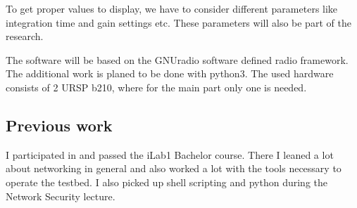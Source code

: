 \documentclass[NET,a4,12pt,ngerman]{netforms}
\begin{document}
To get proper values to display, we have to consider different parameters like
integration time and gain settings etc.
These parameters will also be part of the research.

The software will be based on the GNUradio \cite{gnuradio} software defined radio
framework.  The additional work is planed to be done with python3.
The used hardware consists of 2 URSP b210, where for the main part only one is
needed.


\subsection*{Previous work}
I participated in and passed the iLab1 Bachelor course. There I leaned a lot about networking in general and also worked a lot with the tools necessary to operate the testbed. I also picked up shell scripting and python during the Network Security lecture.  




\end{document}
